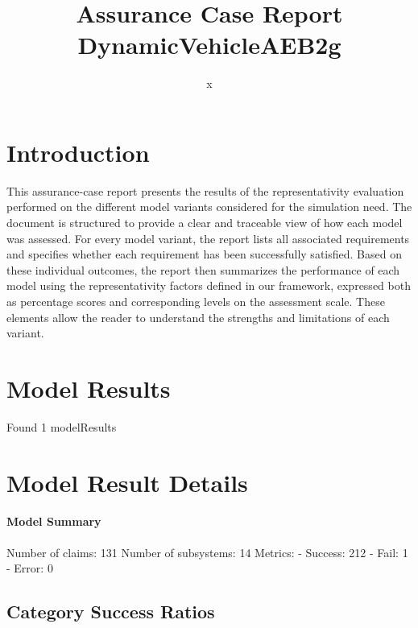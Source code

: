\documentclass{article}
\title{Assurance Case Report DynamicVehicleAEB2g}
\author{x}
\begin{document}
	\maketitle
	\section{Introduction}
	This assurance-case report presents the results of the 
	representativity evaluation performed on the different model variants considered for 
	the simulation need. The document is structured to provide a clear and traceable view of how 
	each model was assessed. For every model variant, the report lists all associated requirements
	 and specifies whether each requirement has been successfully satisfied. Based on these 
	individual outcomes, the report then summarizes the performance of each model using the 
	representativity factors defined in our framework, expressed both as percentage scores 
	and corresponding levels on the assessment scale. These elements allow the reader to understand 
	the strengths and limitations of each variant.
	 
	\section{Model Results}
    Found 1 modelResults
		
			\section{Model Result Details} 
			\paragraph{Model Summary}
			Number of claims: 131
			Number of subsystems: 14
			Metrics:
			- Success: 212
			- Fail: 1
			- Error: 0
			
	

					\subsection{Category Success Ratios}
						
\end{document}
